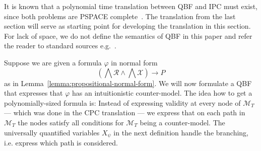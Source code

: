 \documentclass[runningheads]{llncs}
\begin{document}
It is known that a polynomial time translation between QBF and IPC must exist, since both problems are PSPACE complete~\cite{garey1979computers,statman1979intuitionistic}.
The translation from the last section will serve as starting point for developing the translation in this section.
For lack of space, we do not define the semantics of QBF in this paper and refer the reader to standard sources e.g.~\cite{series/faia/2009-185}.

Suppose we are given a formula $\varphi$ in normal form $$\left(\bigwedge\mathcal R\wedge\bigwedge\mathcal X\right)\to P$$ as in Lemma~\ref{lemma:propositional-normal-form}. We will now formulate a QBF that expresses that $\varphi$ has an intuitionistic counter-model. The idea how to get a polynomially-sized formula is: Instead of expressing validity at every node of $\mathcal M_T$ --- which was done in the CPC translation --- we express that on each path in $\mathcal M_T$ the nodes satisfy all conditions for $\mathcal M_T$ being a counter-model. The universally quantified variables $X_\psi$ in the next definition handle the branching, i.e. express which path is considered.
\end{document}
